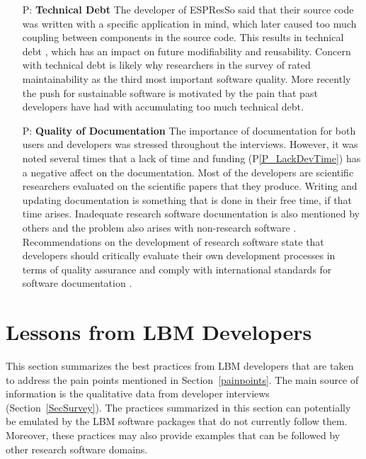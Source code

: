 \documentclass[runningheads]{llncs}
\newcounter{pnum} %
\newcommand{\ppref}[1]{P\ref{#1}}
\begin{document}
\begin{enumerate}
	\item[P\refstepcounter{pnum}\thepnum \label{P_TechDebt}:] \textbf{Technical
	Debt} The developer of ESPResSo said that their source code was written with
	a specific application in mind, which later caused too much coupling between
	components in the source code. This results in technical debt
	\cite{KruchtenEtAl2012}, which has an impact on future modifiability and
	reusability. Concern with technical debt is likely why researchers in the
	survey of \cite{Nguyen-HoanEtAl2010} rated maintainability as the third
	most important software quality. More recently the push for sustainable
	software \cite{deSouzaEtAl2019} is motivated by the pain that past
	developers have had with accumulating too much technical debt.

	\item[P\refstepcounter{pnum}\thepnum \label{P_Documentation}:]
	\textbf{Quality of Documentation}  The importance of documentation for both
	users and developers was stressed throughout the interviews. However, it was
	noted several times that a lack of time and funding (\ppref{P_LackDevTime})
	has a negative affect on the documentation. Most of the developers are
	scientific researchers evaluated on the scientific papers that they produce.
	Writing and updating documentation is something that is done in their free
	time, if that time arises. Inadequate research software documentation is
	also mentioned by others \cite{PintoEtAl2018,WieseEtAl2019} and the
	problem also arises with non-research software \cite{LethbridgeEtAl2003}.
	Recommendations on the development of research software state that
	developers should critically evaluate their own development processes in
	terms of quality assurance and comply with international standards for
	software documentation \cite{KaterbowAndFeulner2018}.

\end{enumerate}

\section{Lessons from LBM Developers} \label{Sec_AddressConcerns}

This section summarizes the best practices from LBM developers that are taken to
address the pain points mentioned in Section~\ref{painpoints}.  The main source
of information is the qualitative data from developer interviews
(Section~\ref{SecSurvey}).  The practices summarized in this section can
potentially be emulated by the LBM software packages that do not currently
follow them.  Moreover, these practices may also provide examples that can be
followed by other research software domains.
\end{document}
